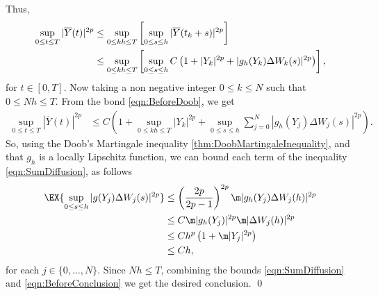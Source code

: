 	Thus, 
	\begin{align}
		\sup_{0\leq t\leq T} |\overline{Y}(t)|^{2p}
		&\leq
			\sup_{0\leq kh\leq T}
			\left[
				\sup_{0\leq s\leq h}
					|\overline{Y}(t_k+s)|^{2p} 
			\right] 
		\notag\\
		&\leq
			\sup_{0\leq kh\leq T} 
			\left[
				\sup_{0\leq s\leq h}
					C 
					\left(
						1 + |Y_k|^{2p} + |g_h(Y_k)\Delta W_k(s)|^{2p}
					\right)
			\right],
		\label{eqn:BeforeDoob}
	\end{align}
	for $t\in [0,T]$.
	Now taking a non negative integer $0 \leq k \leq N$ such that $0\leq Nh \leq T$. From the bond 
	\eqref{eqn:BeforeDoob}, we get
	\begin{align}
		\sup_{0\leq t\leq T} |\overline{Y}(t)|^{2p}
		&\leq 
			C
			\left(
				1
				+
				\sup_{0\leq kh\leq T} 
					|Y_k|^{2p}
					+
					\sup_{0\leq s\leq h}
						\sum_{j=0}^N
							|g_h(Y_j)\Delta W_j(s)|^{2p}
			\right) \label{eqn:SumDiffusion}.
	\end{align}
	So, using the Doob's Martingale inequality \eqref{thm:DoobMartingaleInequality},
	 and that $g_h$ is a locally 
	Lipschitz function, we can bound each term of the inequality \eqref{eqn:SumDiffusion},  as follows
	\begin{align}
		\EX{
			\sup_{0 \leq s \leq h} |g(Y_j) \Delta W_j(s)|^{2p}
		}
		&\leq
			\left(
				\frac{2p}{2p-1}
			\right)^{2p}
			\m|g_h(Y_j)\Delta W_j(h)|^{2p}
			\notag
			\\
		&\leq
			C \m |g_h(Y_j)|^{2p} \m |\Delta W_j(h)|^{2p} \notag\\
		&\leq
			C h^p
			\left(
				1 + \m|Y_j|^{2p}
			\right) \notag \\
		& \leq C h, \label{eqn:BeforeConclusion}
	\end{align}
	for each $j \in \{0,\dots, N\}$.
	Since $Nh\leq T$, combining the bounds \eqref{eqn:SumDiffusion} and \eqref{eqn:BeforeConclusion} we 
	get the desired conclusion. \qed

